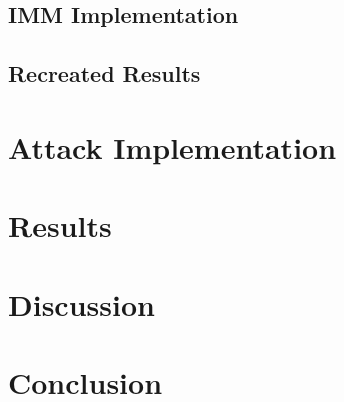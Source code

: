 \documentclass[]{ieeetran}
\begin{document}
\subsection{IMM Implementation}




\subsection{Recreated Results}







\section{Attack Implementation}








\section{Results}







\section{Discussion}%







\section{Conclusion} %
\end{document}

